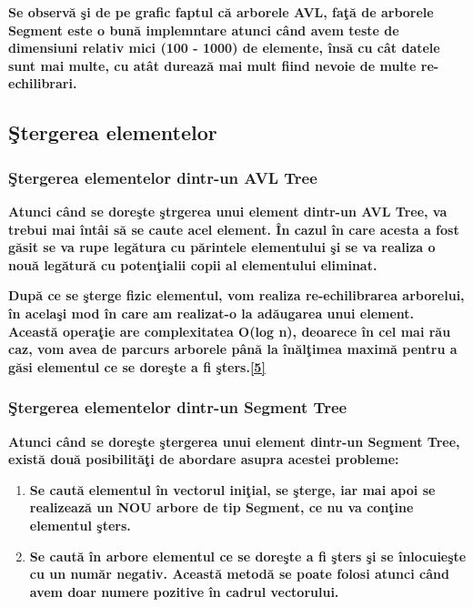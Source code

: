 \documentclass[12pt]{article}
\begin{document}
\textbf{\hspace{7mm} Se observ\u{a} \c{s}i de pe grafic faptul c\u{a} arborele AVL, fa\c{t}\u{a} de arborele Segment este o bun\u{a} implemntare atunci c\^{a}nd avem teste de dimensiuni relativ mici (100 - 1000) de elemente, \^{i}ns\u{a} cu c\^{a}t datele sunt mai multe, cu at\^{a}t dureaz\u{a} mai mult fiind nevoie de multe re-echilibrari. }
\subsection{\c{S}tergerea elementelor}

\subsubsection{\c{S}tergerea elementelor dintr-un AVL Tree}


\textbf{\hspace{7mm} Atunci c\^{a}nd se dore\c{s}te \c{s}trgerea unui element dintr-un AVL Tree, va trebui mai \^{i}nt\^{a}i s\u{a} se caute acel element. \^{I}n cazul \^{i}n care acesta a fost g\u{a}sit se va rupe leg\u{a}tura cu p\u{a}rintele elementului \c{s}i se va realiza o nou\u{a} leg\u{a}tur\u{a} cu poten\c{t}ialii copii al elementului eliminat.}

\textbf{Dup\u{a} ce se \c{s}terge fizic elementul, vom realiza re-echilibrarea arborelui, \^{i}n acela\c{s}i mod \^{i}n care am realizat-o la ad\u{a}ugarea unui element. Aceast\u{a} opera\c{t}ie are complexitatea O(log n), deoarece \^{i}n cel mai r\u{a}u caz, vom avea de parcurs arborele p\^{a}n\u{a} la \^{i}n\u{a}l\c{t}imea maxim\u{a} pentru a g\u{a}si elementul ce se dore\c{s}te a fi \c{s}ters.\hyperlink{page.14}{[5]}}


\subsubsection{\c{S}tergerea elementelor dintr-un Segment Tree}

\textbf{Atunci c\^{a}nd se dore\c{s}te \c{s}tergerea unui element dintr-un Segment Tree, exist\u{a} dou\u{a} posibilit\u{a}\c{t}i de abordare asupra acestei probleme: }

\begin{enumerate}

\item{\textbf{Se caut\u{a} elementul \^{i}n vectorul ini\c{t}ial, se \c{s}terge, iar mai apoi se realizeaz\u{a} un NOU arbore de tip Segment, ce nu va con\c{t}ine elementul \c{s}ters. }}

\item{\textbf{Se caut\u{a} \^{i}n arbore elementul ce se dore\c{s}te a fi \c{s}ters \c{s}i se \^{i}nlocuie\c{s}te cu un num\u{a}r negativ. Aceast\u{a} metod\u{a} se poate folosi atunci c\^{a}nd avem doar numere pozitive \^{i}n cadrul vectorului. }}

\end{enumerate}
\end{document}
